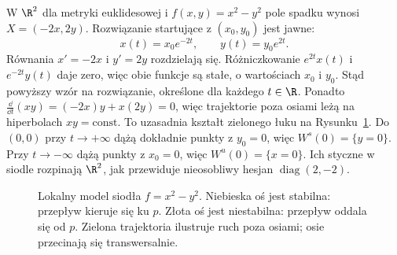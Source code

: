 \begin{przyklad}
\label{prz:siodlo-transwersalne}
W $\R^2$ dla metryki euklidesowej i
$f(x,y)=x^2-y^2$ pole spadku wynosi
$X=(-2x,2y)$. Rozwiązanie startujące z
$(x_0,y_0)$ jest jawne:
\[
 x(t)=x_0e^{-2t},\qquad y(t)=y_0e^{2t}.
\]
Równania $x'=-2x$ i $y'=2y$ rozdzielają się.
Różniczkowanie $e^{2t}x(t)$ i $e^{-2t}y(t)$ daje zero,
więc obie funkcje są stałe, o wartościach $x_0$ i $y_0$.
Stąd powyższy wzór na rozwiązanie, określone dla każdego $t\in\R$.
Ponadto $\frac{\dd}{\dd t}(xy)=(-2x)y+x(2y)=0$,
więc trajektorie poza osiami leżą na hiperbolach $xy=\mathrm{const}$.
To uzasadnia kształt zielonego łuku na
Rysunku~\ref{fig:smale-siodlo}.
Do $(0,0)$ przy $t\to+\infty$ dążą dokładnie
punkty z $y_0=0$, więc
$W^s(0)=\{y=0\}$. Przy $t\to-\infty$
dążą punkty z $x_0=0$, więc
$W^u(0)=\{x=0\}$. Ich styczne w siodle
rozpinają $\R^2$, jak przewiduje
nieosobliwy hesjan $\operatorname{diag}(2,-2)$.
\end{przyklad}

\begin{figure}[H]
\centering
{}
\caption{Lokalny model siodła $f=x^2-y^2$.
Niebieska oś jest stabilna: przepływ kieruje się
ku $p$. Złota oś jest niestabilna: przepływ
oddala się od $p$. Zielona trajektoria ilustruje
ruch poza osiami; osie przecinają się transwersalnie.}
\label{fig:smale-siodlo}
\end{figure}

